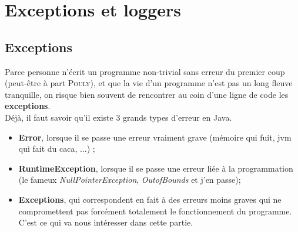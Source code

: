 \documentclass{article}
\begin{document}
\section{Exceptions et loggers}
\subsection{Exceptions}
Parce personne n'écrit un programme non-trivial sans erreur du premier coup (peut-être à part \textsc{Pouly}), et que la vie d'un programme n'est pas un long fleuve tranquille, on risque bien souvent de rencontrer au coin d'une ligne de code les \textbf{exceptions}. \\
Déjà, il faut savoir qu'il existe 3 grands types d'erreur en Java.
\begin{itemize}
\item{\textbf{Error}, lorsque il se passe une erreur vraiment grave (mémoire qui fuit, jvm qui fait du caca, ...) ;}
\item{\textbf{RuntimeException}, lorsque il se passe une erreur liée à la programmation (le fameux \emph{NullPointerException}, \emph{OutofBounds} et j'en passe);}
\item{\textbf{Exceptions}, qui correspondent en fait à des erreurs moins graves qui ne compromettent pas forcément totalement le fonctionnement du programme. C'est ce qui va nous intéresser dans cette partie.}
\end{itemize}
\end{document}
